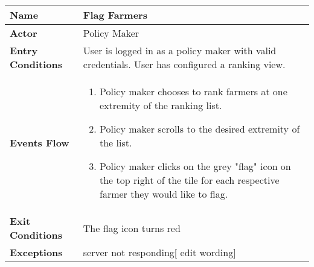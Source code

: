 
\begin{center}
\begin{tabular}{|l|>{\raggedright\arraybackslash}m{12cm}|}

    \hline
    \textbf{Name} & Flag Farmers\\
    \hline
   	\textbf{Actor} & Policy Maker\\
    \hline
    \textbf{Entry Conditions} & User is logged in as a policy maker with valid credentials. User has configured a ranking view.\\
    \hline
    \textbf{Events Flow} & \begin{enumerate}
    \item Policy maker chooses to rank farmers at one extremity of the ranking list. 
    \item Policy maker scrolls to the desired extremity of the list.
    \item Policy maker clicks on the grey "flag" icon on the top right of the tile for each respective farmer they would like to flag. 
    \end{enumerate}\\
    \hline
    \textbf{Exit Conditions} & The flag icon turns red \\
    \hline
    \textbf{Exceptions} & server not responding[ edit wording]\\
    \hline
\end{tabular}
\end{center}